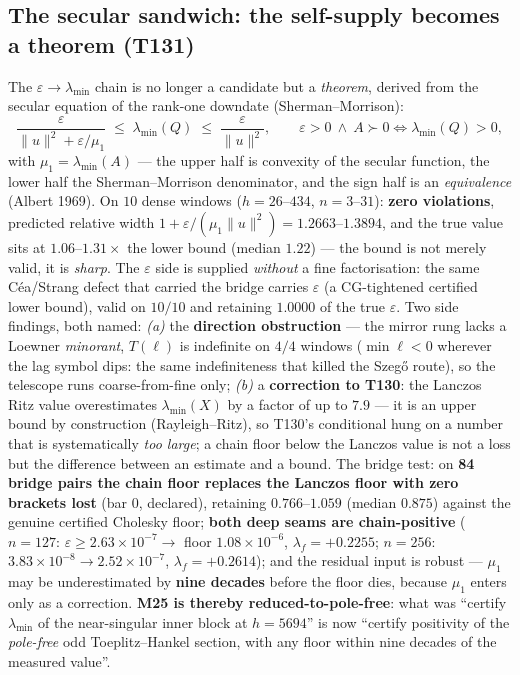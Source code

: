 \documentclass[11pt,a4paper]{article}
\begin{document}
\subsection{The secular sandwich: the self-supply becomes a theorem (T131)}
The $\varepsilon\to\lambda_{\min}$ chain is no longer a candidate but a \emph{theorem},
derived from the secular equation of the rank-one downdate (Sherman--Morrison):
\[
\frac{\varepsilon}{\|u\|^{2}+\varepsilon/\mu_{1}}
\;\le\; \lambda_{\min}(Q) \;\le\; \frac{\varepsilon}{\|u\|^{2}},
\qquad
\varepsilon>0 \ \wedge\ A\succ0 \iff \lambda_{\min}(Q)>0 ,
\]
with $\mu_{1}=\lambda_{\min}(A)$ --- the upper half is convexity of the secular function,
the lower half the Sherman--Morrison denominator, and the sign half is an
\emph{equivalence} (Albert 1969). On $10$ dense windows ($h=26$--$434$, $n=3$--$31$):
\textbf{zero violations}, predicted relative width $1+\varepsilon/(\mu_{1}\|u\|^{2})
= 1.2663$--$1.3894$, and the true value sits at $1.06$--$1.31\times$ the lower bound
(median $1.22$) --- the bound is not merely valid, it is \emph{sharp}. The $\varepsilon$
side is supplied \emph{without} a fine factorisation: the same C\'ea/Strang defect that
carried the bridge carries $\varepsilon$ (a CG-tightened certified lower bound), valid on
$10/10$ and retaining $1.0000$ of the true $\varepsilon$. Two side findings, both named:
\emph{(a)} the \textbf{direction obstruction} --- the mirror rung lacks a Loewner
\emph{minorant}, $T(\ell)$ is indefinite on $4/4$ windows ($\min\ell<0$ wherever the lag
symbol dips: the same indefiniteness that killed the Szeg\H{o} route), so the telescope
runs coarse-from-fine only; \emph{(b)} a \textbf{correction to T130}: the Lanczos Ritz
value overestimates $\lambda_{\min}(X)$ by a factor of up to $\mathbf{7.9}$ --- it is an
upper bound by construction (Rayleigh--Ritz), so T130's conditional hung on a number that
is systematically \emph{too large}; a chain floor below the Lanczos value is not a loss but
the difference between an estimate and a bound. The bridge test: on \textbf{84 bridge pairs
the chain floor replaces the Lanczos floor with zero brackets lost} (bar $0$, declared),
retaining $0.766$--$1.059$ (median $0.875$) against the genuine certified Cholesky floor;
\textbf{both deep seams are chain-positive} ($n=127$: $\varepsilon\ge2.63\times10^{-7}\to$
floor $1.08\times10^{-6}$, $\lambda_f=+0.2255$; $n=256$: $3.83\times10^{-8}\to
2.52\times10^{-7}$, $\lambda_f=+0.2614$); and the residual input is robust --- $\mu_{1}$
may be underestimated by \textbf{nine decades} before the floor dies, because $\mu_{1}$
enters only as a correction. \textbf{M25 is thereby reduced-to-pole-free}: what was
``certify $\lambda_{\min}$ of the near-singular inner block at $h=5694$'' is now ``certify
positivity of the \emph{pole-free} odd Toeplitz--Hankel section, with any floor within nine
decades of the measured value''.
\end{document}
